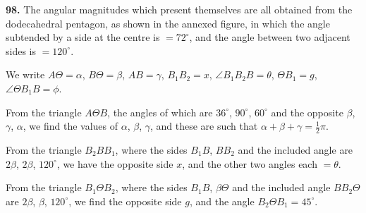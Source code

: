 \documentclass[11pt,a4paper]{article}
\newcommand{\artno}[1]{\textbf{#1.}\quad}
\begin{document}
\artno{98} The angular magnitudes which present themselves are all obtained
from the dodecahedral pentagon, as shown in the annexed figure, in which the
angle subtended by a side at the centre is $=72^{\circ}$, and the angle
between two adjacent sides is $=120^{\circ}$.

\begin{center}
\end{center}

We write
$A\Theta = \alpha$, $B\Theta = \beta$, $AB = \gamma$, $B_{1}B_{2} = x$,
$\angle B_{1}B_{2}B = \theta$, $\Theta B_{1} = g$,
$\angle\Theta B_{1}B = \phi$.

From the triangle $A\Theta B$, the angles of which are $36^{\circ}$,
$90^{\circ}$, $60^{\circ}$ and the opposite $\beta$, $\gamma$, $\alpha$, we
find the values of $\alpha$, $\beta$, $\gamma$, and these are such that
$\alpha + \beta + \gamma = \tfrac{1}{2}\pi$.

From the triangle $B_{2}B B_{1}$, where the sides $B_{1}B$, $B B_{2}$ and the
included angle are $2\beta$, $2\beta$, $120^{\circ}$, we have the opposite
side $x$, and the other two angles each $=\theta$.

From the triangle $B_{1}\Theta B_{2}$, where the sides $B_{1}B$, $\beta\Theta$
and the included angle $B B_{2}\Theta$ are $2\beta$, $\beta$, $120^{\circ}$,
we find the opposite side $g$, and the angle $B_{2}\Theta B_{1} = 45^{\circ}$.
\end{document}
